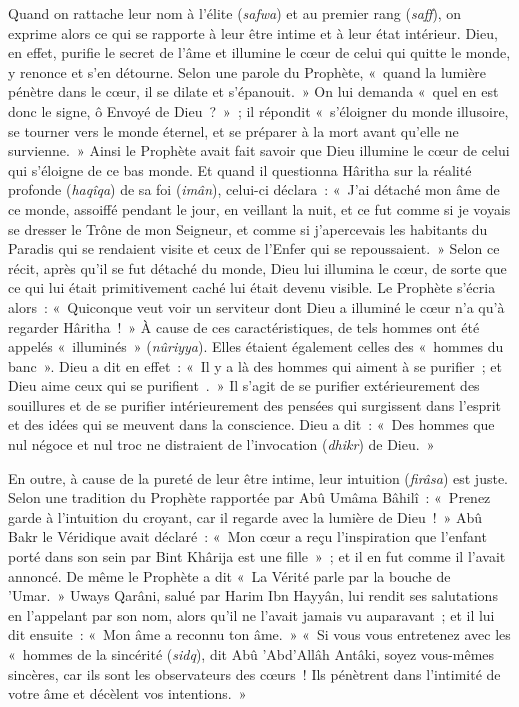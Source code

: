 Quand on rattache leur nom à l'élite (\emph{safwa}) et au premier rang
(\emph{saff}), on exprime alors ce qui se rapporte à leur être intime et
à leur état intérieur. Dieu, en effet, purifie le secret de l'âme et
illumine le cœur de celui qui quitte le monde, y renonce et s'en
détourne. Selon une parole du Prophète, «~quand la lumière pénètre dans
le cœur, il se dilate et s'épanouit.~» On lui demanda «~quel en est donc
le signe, ô Envoyé de Dieu~?~»~; il répondit «~s'éloigner du monde
illusoire, se tourner vers le monde éternel, et se préparer à la mort
avant qu'elle ne survienne.~» Ainsi le Prophète avait fait savoir que
Dieu illumine le cœur de celui qui s'éloigne de ce bas monde. Et quand
il questionna Hâritha sur la réalité profonde (\emph{haqîqa}) de sa foi
(\emph{imân}), celui-ci déclara~: «~J'ai détaché mon âme de ce monde,
assoiffé pendant le jour, en veillant la nuit, et ce fut comme si je
voyais se dresser le Trône de mon Seigneur, et comme si j'apercevais les
habitants du Paradis qui se rendaient visite et ceux de l'Enfer qui se
repoussaient.~» Selon ce récit, après qu'il se fut détaché du monde,
Dieu lui illumina le cœur, de sorte que ce qui lui était primitivement
caché lui était devenu visible. Le Prophète s'écria alors~: «~Quiconque
veut voir un serviteur dont Dieu a illuminé le cœur n'a qu'à regarder
Hâritha~!~» À cause de ces caractéristiques, de tels hommes ont été
appelés «~illuminés~» (\emph{nûriyya}). Elles étaient également celles
des «~hommes du banc~». Dieu a dit en effet~: «~Il y a là des hommes qui
aiment à se purifier~; et Dieu aime ceux qui se purifient~.~» Il s'agit
de se purifier extérieurement des souillures et de se purifier
intérieurement des pensées qui surgissent dans l'esprit et des idées qui
se meuvent dans la conscience. Dieu a dit~: «~Des hommes que nul négoce
et nul troc ne distraient de l'invocation (\emph{dhikr}) de Dieu.~»

En outre, à cause de la pureté de leur être intime, leur intuition
(\emph{firâsa}) est juste. Selon une tradition du Prophète rapportée par
Abû Umâma Bâhilî~: «~Prenez garde à l'intuition du croyant, car il
regarde avec la lumière de Dieu~!~» Abû Bakr le Véridique avait
déclaré~: «~Mon cœur a reçu l'inspiration que l'enfant porté dans son
sein par Bint Khârija est une fille~»~; et il en fut comme il l'avait
annoncé. De même le Prophète a dit «~La Vérité parle par la bouche de
'Umar.~» Uways Qarâni, salué par Harim Ibn Hayyân, lui rendit ses
salutations en l'appelant par son nom, alors qu'il ne l'avait jamais vu
auparavant~; et il lui dit ensuite~: «~Mon âme a reconnu ton âme.~» «~Si
vous vous entretenez avec les «~hommes de la sincérité (\emph{sidq}),
dit Abû 'Abd'Allâh Antâki, soyez vous-mêmes sincères, car ils sont les
observateurs des cœurs~! Ils pénètrent dans l'intimité de votre âme et
décèlent vos intentions.~»

